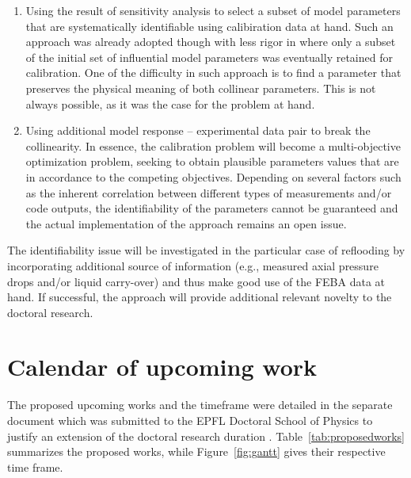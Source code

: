 \documentclass[11pt,titlepage]{article}
\begin{document}
\begin{enumerate}
    \item Using the result of sensitivity analysis to select a subset of model 
    parameters that are systematically identifiable using calibiration data 
    at hand. 
    Such an approach was already adopted though with less rigor in 
    \cite{Wicaksono2016} where only a subset of the 
    initial set of influential model parameters was eventually retained 
    for calibration.
    One of the difficulty in such approach is to find a parameter that preserves
    the physical meaning of both collinear parameters.
    This is not always possible, as it was the case for the problem at hand.
    
    \item Using additional model response – experimental data pair to break the 
    collinearity. 
    In essence, the calibration problem will become a 
    multi-objective optimization problem, seeking to obtain plausible parameters 
    values that are in accordance to the competing objectives. 
    Depending on several factors such as the inherent correlation between 
    different types of measurements and/or code outputs, the identifiability 
    of the parameters cannot be guaranteed and the actual implementation of the 
    approach remains an open issue. 
\end{enumerate}

The identifiability issue will be investigated  in the particular case of reflooding by incorporating additional source of information (e.g., measured axial pressure drops and/or liquid carry-over) and thus make good use of the FEBA data at hand. If successful, the approach will provide additional relevant novelty to the doctoral research.


\section{Calendar of upcoming work}

The proposed upcoming works and the timeframe were detailed in the separate 
document which was submitted to the EPFL Doctoral School of Physics to 
justify an extension of the doctoral research duration \cite{Wicaksono2016d}.
Table~\ref{tab:proposedworks} summarizes the proposed works, while Figure~\ref{fig:gantt} gives their respective time frame.
\end{document}
